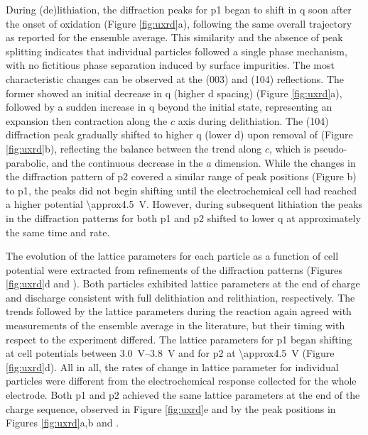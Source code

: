 \documentclass{article}
\begin{document}
During (de)lithiation, the diffraction peaks for \gls{p1} began to
shift in \gls{q} soon after the onset of oxidation (Figure
\ref{fig:uxrd}a), following the same overall trajectory as reported
for the ensemble average\cite{robert2015}. This similarity and the
absence of peak splitting indicates that individual particles followed
a single phase mechanism, with no fictitious phase separation induced
by surface impurities\cite{grenier2017}. The most characteristic
changes can be observed at the (003) and (104) reflections. The former
showed an initial decrease in \gls{q} (higher d spacing) (Figure
\ref{fig:uxrd}a), followed by a sudden increase in \gls{q} beyond the
initial state, representing an expansion then contraction along the
$c$ axis during delithiation\cite{robert2015}. The (104) diffraction
peak gradually shifted to higher \gls{q} (lower d) upon removal of
 (Figure \ref{fig:uxrd}b), reflecting the balance between the
trend along $c$, which is pseudo-parabolic, and the continuous
decrease in the $a$ dimension.\cite{robert2015} While the changes in
the diffraction pattern of \gls{p2} covered a similar range of peak
positions (Figure b) to \gls{p1}, the peaks did
not begin shifting until the electrochemical cell had reached a higher
potential \SI{\approx4.5}{\volt}. However, during subsequent
lithiation the peaks in the diffraction patterns for both \gls{p1} and
\gls{p2} shifted to lower \gls{q} at approximately the same time and
rate.

The evolution of the lattice parameters for each particle as a
function of cell potential were extracted from refinements of the
diffraction patterns (Figures \ref{fig:uxrd}d and
). Both particles exhibited lattice parameters
at the end of charge and discharge consistent with full delithiation
and relithiation, respectively\cite{novak2015}. The trends followed by
the lattice parameters during the reaction again agreed with
measurements of the ensemble average in the literature\cite{novak2015,
  faenza2018}, but their timing with respect to the experiment
differed. The lattice parameters for \gls{p1} began shifting at cell
potentials between \SIrange{3.0}{3.8}{\volt} and for \gls{p2} at
\SI{\approx4.5}{\volt} (Figure \ref{fig:uxrd}d). All in all, the rates
of change in lattice parameter for individual particles were different
from the electrochemical response collected for the whole
electrode. Both \gls{p1} and \gls{p2} achieved the same lattice
parameters at the end of the charge sequence, observed in Figure
\ref{fig:uxrd}e and by the peak positions in Figures \ref{fig:uxrd}a,b
and .
\end{document}
